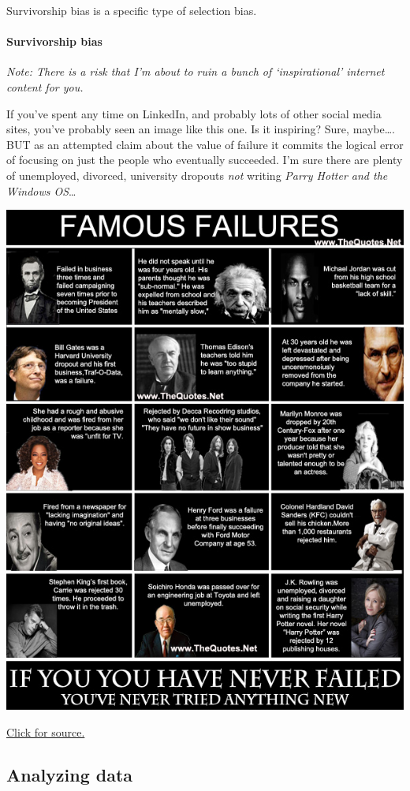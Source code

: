 \documentclass[
  openany]{book}
\begin{document}
Survivorship bias is a specific type of selection bias.

\hypertarget{survivorship-bias}{%
\paragraph{Survivorship bias}\label{survivorship-bias}}

\emph{Note: There is a risk that I'm about to ruin a bunch of `inspirational' internet content for you.}

If you've spent any time on LinkedIn, and probably lots of other social media sites, you've probably seen an image like this one. Is it inspiring? Sure, maybe\ldots. BUT as an attempted claim about the value of failure it commits the logical error of focusing on just the people who eventually succeeded. I'm sure there are plenty of unemployed, divorced, university dropouts \emph{not} writing \emph{Parry Hotter and the Windows OS}\ldots{}

\begin{center}\includegraphics[width=0.65\linewidth]{images/m2/failures} \end{center}

\href{https://www.thequotes.net/2013/08/failures-are-stepping-stones-to-success/}{Click for source.}

\hypertarget{analyzingethics}{%
\subsection{Analyzing data}\label{analyzingethics}}
\end{document}
